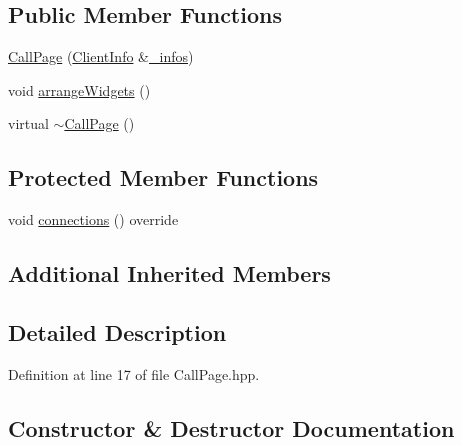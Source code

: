 \subsection*{Public Member Functions}
\begin{DoxyCompactItemize}
\item 
\mbox{\hyperlink{classbabel_1_1client_1_1_call_page_a3a618f5f8e2b7bdfac40f93e16642e17}{Call\+Page}} (\mbox{\hyperlink{classbabel_1_1client_1_1_client_info}{Client\+Info}} \&\mbox{\hyperlink{classbabel_1_1client_1_1_a_babel_page_aa2070ebfda878ceff938b8a60e7e2898}{\+\_\+infos}})
\item 
void \mbox{\hyperlink{classbabel_1_1client_1_1_call_page_a083eb526e44f03c413fc7841bd2d45f9}{arrange\+Widgets}} ()
\item 
virtual \mbox{\hyperlink{classbabel_1_1client_1_1_call_page_ab76eba4b12401b785d9d75786b386a54}{$\sim$\+Call\+Page}} ()
\end{DoxyCompactItemize}
\subsection*{Protected Member Functions}
\begin{DoxyCompactItemize}
\item 
void \mbox{\hyperlink{classbabel_1_1client_1_1_call_page_af870c94b659fbdeab276b59f61bf3008}{connections}} () override
\end{DoxyCompactItemize}
\subsection*{Additional Inherited Members}


\subsection{Detailed Description}


Definition at line 17 of file Call\+Page.\+hpp.



\subsection{Constructor \& Destructor Documentation}
\mbox{\label{classbabel_1_1client_1_1_call_page_a3a618f5f8e2b7bdfac40f93e16642e17}} 
